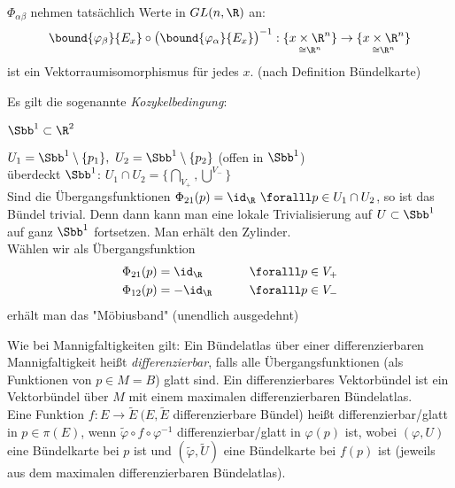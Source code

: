 \begin{rem*}
	$\Phi_{\alpha \beta}$ nehmen tatsächlich Werte in $GL(n,\R)$ an:
	$$ \bound{\varphi_\beta}{E_x} \circ \big( \bound{\varphi_\alpha}{E_x} \big)^{-1}: \underset{\cong \R^n}{\{x \times \R^n\}} \to \underset{\cong \R^n}{\{x \times \R^n\}} $$
	ist ein Vektorraumisomorphismus für jedes $x$. (nach Definition Bündelkarte)
\end{rem*}

\begin{rem*}
	Es gilt die sogenannte \emph{Kozykelbedingung}:
\end{rem*}

\begin{exmp*}
	$ \Sbb^1 \subset \R^2 $\\
	\begin{minipage}{\linewidth}
		\begin{wrapfigure}{R}{4cm}
			\centering
		\end{wrapfigure}
		$ U_1 = \Sbb^1 \setminus \{p_1\},\ U_2 = \Sbb^1 \setminus \{p_2\} $ (offen in $\Sbb^1$)\\
		überdeckt $\Sbb^1$: $ U_1 \cap U_2 = \bigg\{ \underset{V_+}{\bigcap}, \overset{V_-}{\bigcup} \bigg\} $\\
		Sind die Übergangsfunktionen $ \Phi_{21}(p) = \id_\R\ \foralll p \in U_1 \cap U_2 $, so ist das Bündel trivial. Denn dann kann man eine lokale Trivialisierung auf $ U \subset \Sbb^1 $ auf ganz $\Sbb^1$ fortsetzen. Man erhält den Zylinder.\\
		Wählen wir als Übergangsfunktion
		\begin{alignat*}{2}
			\Phi_{21}(p) &= \id_\R \qquad &&\foralll p \in V_+\\
			\Phi_{12}(p) &= -\id_\R \qquad &&\foralll p \in V_-
		\end{alignat*}
		erhält man das "Möbiusband" (unendlich ausgedehnt)
	\end{minipage}
\end{exmp*}

\begin{defn*}
	Wie bei Mannigfaltigkeiten gilt: Ein Bündelatlas über einer differenzierbaren Mannigfaltigkeit heißt \emph{differenzierbar}, falls alle Übergangsfunktionen (als Funktionen von $p \in M = B$) glatt sind. Ein differenzierbares Vektorbündel ist ein Vektorbündel über $M$ mit einem maximalen differenzierbaren Bündelatlas.\\
	Eine Funktion $ f: E \to \tilde{E}\ (E,\tilde{E}$ differenzierbare Bündel) heißt differenzierbar/glatt in $p \in \pi(E)$, wenn $ \tilde{\varphi} \circ f \circ \varphi^{-1} $ differenzierbar/glatt in $\varphi(p)$ ist, wobei $(\varphi,U)$ eine Bündelkarte bei $p$ ist und $(\tilde{\varphi},\tilde{U})$ eine Bündelkarte bei $f(p)$ ist (jeweils aus dem maximalen differenzierbaren Bündelatlas). 
\end{defn*}

